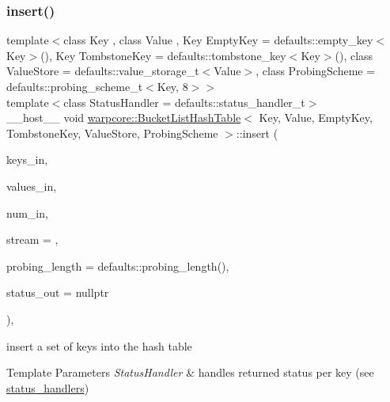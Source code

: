 \subsubsection{\texorpdfstring{insert()}{insert()}\hspace{0.1cm}{\footnotesize\ttfamily [2/2]}}
{\footnotesize\ttfamily template$<$class Key , class Value , Key Empty\+Key = defaults\+::empty\+\_\+key$<$\+Key$>$(), Key Tombstone\+Key = defaults\+::tombstone\+\_\+key$<$\+Key$>$(), class Value\+Store  = defaults\+::value\+\_\+storage\+\_\+t$<$\+Value$>$, class Probing\+Scheme  = defaults\+::probing\+\_\+scheme\+\_\+t$<$\+Key, 8$>$$>$ \\
template$<$class Status\+Handler  = defaults\+::status\+\_\+handler\+\_\+t$>$ \\
\+\_\+\+\_\+host\+\_\+\+\_\+ void \hyperlink{classwarpcore_1_1BucketListHashTable}{warpcore\+::\+Bucket\+List\+Hash\+Table}$<$ Key, Value, Empty\+Key, Tombstone\+Key, Value\+Store, Probing\+Scheme $>$\+::insert (\begin{DoxyParamCaption}\item[{const key\+\_\+type $\ast$const}]{keys\+\_\+in,  }\item[{const value\+\_\+type $\ast$const}]{values\+\_\+in,  }\item[{const index\+\_\+type}]{num\+\_\+in,  }\item[{const cuda\+Stream\+\_\+t}]{stream = {},  }\item[{const index\+\_\+type}]{probing\+\_\+length = {\ttfamily defaults\+:\+:probing\+\_\+length()},  }\item[{typename Status\+Handler\+::base\+\_\+type $\ast$const}]{status\+\_\+out = {\ttfamily nullptr} }\end{DoxyParamCaption})\hspace{0.3cm}{\ttfamily [inline]}, {\ttfamily [noexcept]}}



insert a set of keys into the hash table 


\begin{DoxyTemplParams}{Template Parameters}
{\em Status\+Handler} & handles returned status per key (see {\ttfamily \hyperlink{namespacewarpcore_1_1status__handlers}{status\+\_\+handlers}}) \\
\hline
\end{DoxyTemplParams}

